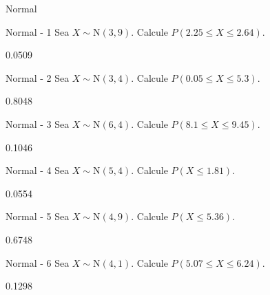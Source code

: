 \documentclass[a4,11pt]{aleph-notas}
\newcommand{\Norm}{\text{N}}
\begin{document}
\begin{quiz}{Normal}

\begin{numerical}[tolerance=0.01]%
    {Normal - 1}
    Sea \( X \sim \Norm(3, 9) \). Calcule \( P(2.25 \leq X \leq 2.64) \).
    \item[] 0.0509
\end{numerical}

\begin{numerical}[tolerance=0.01]%
    {Normal - 2}
    Sea \( X \sim \Norm(3, 4) \). Calcule \( P(0.05 \leq X \leq 5.3) \).
    \item[] 0.8048
\end{numerical}

\begin{numerical}[tolerance=0.01]%
    {Normal - 3}
    Sea \( X \sim \Norm(6, 4) \). Calcule \( P(8.1 \leq X \leq 9.45) \).
    \item[] 0.1046
\end{numerical}

\begin{numerical}[tolerance=0.01]%
    {Normal - 4}
    Sea \( X \sim \Norm(5, 4) \). Calcule \( P(X \leq 1.81) \).
    \item[] 0.0554
\end{numerical}

\begin{numerical}[tolerance=0.01]%
    {Normal - 5}
    Sea \( X \sim \Norm(4, 9) \). Calcule \( P(X \leq 5.36) \).
    \item[] 0.6748
\end{numerical}

\begin{numerical}[tolerance=0.01]%
    {Normal - 6}
    Sea \( X \sim \Norm(4, 1) \). Calcule \( P(5.07 \leq X \leq 6.24) \).
    \item[] 0.1298
\end{numerical}


\end{quiz}
\end{document}
